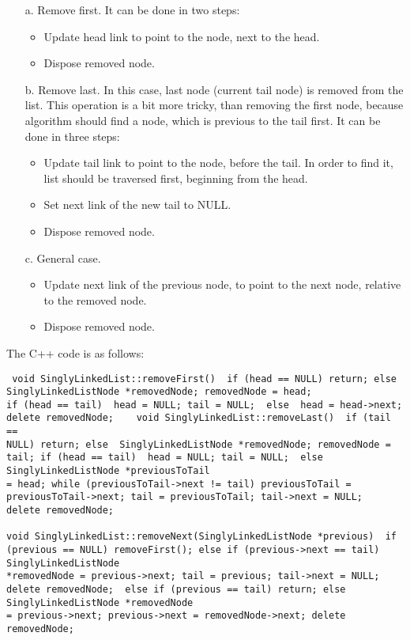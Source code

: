 \documentclass[10pt]{article}
\begin{document}
\begin{itemize}
\item [a.] Remove first. It can be done in two steps: 

\begin{itemize}
\item Update head link to point to the node, next to the head.

\item Dispose
removed node. \end{itemize}

\item [b.] Remove last.
In this case, last node (current tail node) is removed from the list. This operation is a bit more tricky, than removing the first node, because algorithm
should find a node, which is previous to the tail first. It can be done in three steps: 

\begin{itemize}
\item Update tail link to point to the node, before the tail. In order to find it, list should be traversed first, beginning
from the head.

\item Set next link of the new tail to NULL.

\item Dispose
removed node. \end{itemize}

\item [c.] General case.

\begin{itemize}
\item Update next link of the previous node, to point to the next node, relative to the removed node.

\item Dispose
removed node. \end{itemize}
\end{itemize}

The C++ code is as follows: 
\begin{lstlisting} void SinglyLinkedList::removeFirst()  if (head == NULL) return; else  SinglyLinkedListNode *removedNode; removedNode = head;
if (head == tail)  head = NULL; tail = NULL;  else  head = head->next;  delete removedNode;    void SinglyLinkedList::removeLast()  if (tail ==
NULL) return; else  SinglyLinkedListNode *removedNode; removedNode = tail; if (head == tail)  head = NULL; tail = NULL;  else  SinglyLinkedListNode *previousToTail
= head; while (previousToTail->next != tail) previousToTail = previousToTail->next; tail = previousToTail; tail->next = NULL;  delete removedNode;

void SinglyLinkedList::removeNext(SinglyLinkedListNode *previous)  if (previous == NULL) removeFirst(); else if (previous->next == tail)  SinglyLinkedListNode
*removedNode = previous->next; tail = previous; tail->next = NULL; delete removedNode;  else if (previous == tail) return; else  SinglyLinkedListNode *removedNode
= previous->next; previous->next = removedNode->next; delete removedNode;   \end{lstlisting}
\end{document}
